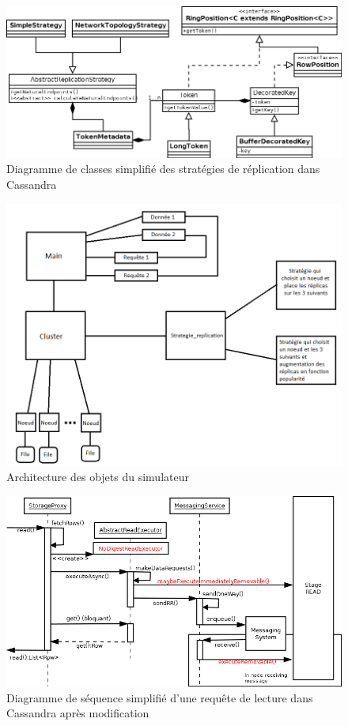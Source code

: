 \documentclass[12pt]{article}
\begin{document}
\begin{figure}[p]
	\centering
		\includegraphics[width=15cm]{images/architecture/replication_diagram.png}
	\caption{Diagramme de classes simplifié des stratégies de réplication dans Cassandra \label{fig:replication_diagram}}
\end{figure}

\clearpage


\begin{figure}[H]
	\centering
        \includegraphics[width=12cm]{images/implementation/archiSimulateur.png}
    \caption{Architecture des objets du simulateur \label{fig:archisimulateur}}
\end{figure}

\begin{figure}[H]
	\centering
        \includegraphics[width=12cm]{images/implementation/read_diagram_modified.png}
    \caption{Diagramme de séquence simplifié d'une requête de lecture dans Cassandra après modification \label{fig:read_diagram_modified}}
\end{figure}
\end{document}
